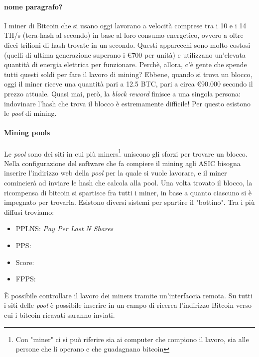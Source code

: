 \documentclass {article}
\begin{document}
\paragraph {nome paragrafo?}

I miner di Bitcoin che si usano oggi lavorano a velocità comprese tra i 10 e i 14 TH/s (tera-hash al secondo) in base al loro consumo energetico, ovvero a oltre dieci trilioni di hash trovate in un secondo.
Questi apparecchi sono molto costosi (quelli di ultima generazione superano i \euro{700} per unità) e utilizzano un'elevata quantità di energia elettrica per funzionare.
Perchè, allora, c'è gente che spende tutti questi soldi per fare il lavoro di mining?
Ebbene, quando si trova un blocco, oggi il miner riceve una quantità pari a 12.5 BTC, pari a circa \euro{90.000} secondo il prezzo attuale.
Quasi mai, però, la \textit{block reward} finisce a una singola persona: indovinare l'hash che trova il blocco è estremamente difficile!
Per questo esistono le \textit{pool} di mining.


\paragraph {Mining pools}


Le \textit{pool} sono dei siti in cui più miners\footnote{Con "miner" ci si può riferire sia ai computer che compiono il lavoro, sia alle persone che li operano e che guadagnano bitcoin} uniscono gli sforzi per trovare un blocco.
Nella configurazione del software che fa compiere il mining agli ASIC bisogna inserire l'indirizzo web della \textit{pool} per la quale si vuole lavorare, e il miner comincierà ad inviare le hash che calcola alla pool.
Una volta trovato il blocco, la ricompensa di bitcoin si spartisce fra tutti i miner, in base a quanto ciascuno si è impegnato per trovarla.
Esistono diversi sistemi per spartire il "bottino". Tra i più diffusi troviamo:

\begin{itemize}
\item PPLNS: \textit{Pay Per Last N Shares}
\item PPS:
\item Score:
\item FPPS:
\end{itemize}
%
È possibile controllare il lavoro dei miners tramite un'interfaccia remota. Su tutti i siti delle \textit{pool} è possibile inserire in un campo di ricerca l'indirizzo Bitcoin verso cui i bitcoin ricavati saranno inviati.
\end{document}
